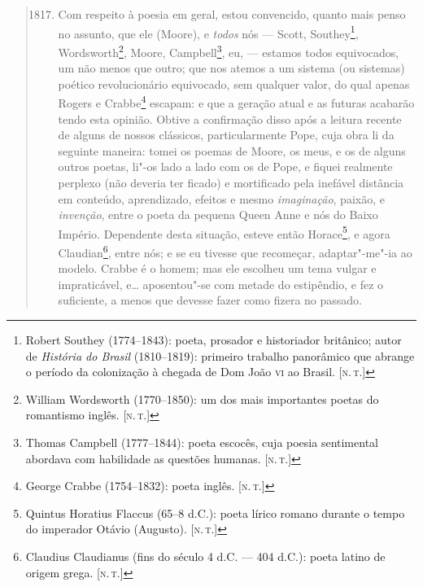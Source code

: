 \begin{quote} %
\begin{enumerate}[label=(\arabic*)]
  \setcounter{enumi}{1816}
\item\mbox{} Com respeito à poesia em geral, estou convencido, quanto mais
penso no assunto, que ele (Moore), e \emph{todos} nós --- Scott,
Southey\footnote{Robert Southey (1774--1843): poeta, prosador e
  historiador britânico; autor de \emph{História do Brasil}
  (1810--1819): primeiro trabalho panorâmico que abrange o
  período da colonização à chegada de Dom João \textsc{vi} ao Brasil. {[}\textsc{n.\,t.}{]}}, Wordsworth\footnote{William Wordsworth (1770--1850): um dos
  mais importantes poetas do romantismo inglês. {[}\textsc{n.\,t.}{]}}, Moore,
Campbell\footnote{Thomas Campbell (1777--1844): poeta escocês, cuja
  poesia sentimental abordava com habilidade as questões humanas. {[}\textsc{n.\,t.}{]}}, eu, --- estamos todos equivocados, um não menos que outro;
que nos atemos a um sistema (ou sistemas) poético revolucionário
equivocado, sem qualquer valor, do qual apenas Rogers e Crabbe\footnote{George
  Crabbe (1754--1832): poeta inglês. {[}\textsc{n.\,t.}{]}} escapam: e que a
geração atual e as futuras acabarão tendo esta opinião. Obtive a
confirmação disso após a leitura recente de alguns de nossos clássicos,
particularmente Pope, cuja obra li da seguinte maneira: tomei os poemas
de Moore, os meus, e os de alguns outros poetas, li"-os lado a lado com
os de Pope, e fiquei realmente perplexo (não deveria ter ficado) e
mortificado pela inefável distância em conteúdo, aprendizado, efeitos e
mesmo \emph{imaginação}, paixão, e \emph{invenção}, entre o poeta da
pequena Queen Anne e nós do Baixo Império. Dependente desta situação,
esteve então Horace\footnote{Quintus Horatius Flaccus (65--8 d.C.): poeta lírico romano durante o tempo do imperador Otávio
  (Augusto). {[}\textsc{n.\,t.}{]}}, e agora Claudian\footnote{Claudius
  Claudianus (fins do século 4 d.C. --- 404 d.C.): poeta latino de origem
  grega. {[}\textsc{n.\,t.}{]}}, entre nós; e se eu tivesse que recomeçar,
adaptar"-me"-ia ao modelo. Crabbe é o homem; mas ele escolheu um tema
vulgar e impraticável, e\ldots{} aposentou"-se com metade do estipêndio, e fez
o suficiente, a menos que devesse fazer como fizera no passado.


\end{enumerate}
\end{quote}
